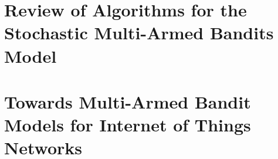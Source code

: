 \setcounter{mtc}{1}
\adjustmtc



\part{Review of Algorithms for the Stochastic Multi-Armed Bandits Model}







\part{Towards Multi-Armed Bandit Models for Internet of Things Networks}









